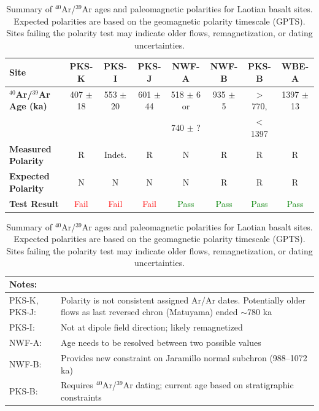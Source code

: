 \documentclass[twocolumn,11pt]{article}
\begin{document}
\begin{table}[htbp]
    \centering
    \caption{Summary of $^{40}$Ar/$^{39}$Ar ages and paleomagnetic polarities for Laotian basalt sites. Expected polarities are based on the geomagnetic polarity timescale (GPTS). Sites failing the polarity test may indicate older flows, remagnetization, or dating uncertainties.}
    \label{tab:age_polarity_summary}
    \small
    \begin{tabular}{|l|c|c|c|c|c|c|c|}
        \hline
        \textbf{Site} & \textbf{PKS-K} & \textbf{PKS-I} & \textbf{PKS-J} & \textbf{NWF-A} & \textbf{NWF-B} & \textbf{PKS-B} & \textbf{WBE-A} \\
        \hline
        \textbf{$^{40}$Ar/$^{39}$Ar Age (ka)} & 407 $\pm$ 18 & 553 $\pm$ 20 & 601 $\pm$ 44 & 518 $\pm$ 6 or & 935 $\pm$ 5 & $>$770, & 1397 $\pm$ 13 \\
        & & & & 740 $\pm$ ? & & $<$1397 & \\
        \hline
        \textbf{Measured Polarity} & R & Indet. & R & N & R & R & R \\
        \hline
        \textbf{Expected Polarity} & N & N & N & N & R & R & R \\
        \hline
        \textbf{Test Result} & \textcolor{red}{Fail} & \textcolor{red}{Fail} & \textcolor{red}{Fail} & \textcolor{green}{Pass} & \textcolor{green}{Pass} & \textcolor{green}{Pass} & \textcolor{green}{Pass} \\
        \hline
    \end{tabular}
    \vspace{0.5em}
    
    \footnotesize
    \begin{tabular}{|p{}|p{}|}
        \hline
        \textbf{Notes:} & \\
        \hline
        PKS-K, PKS-J: & Polarity is not consistent assigned Ar/Ar dates. Potentially older flows as last reversed chron (Matuyama) ended $\sim$780 ka \\
        \hline
        PKS-I: & Not at dipole field direction; likely remagnetized \\
        \hline
        NWF-A: & Age needs to be resolved between two possible values \\
        \hline
        NWF-B: & Provides new constraint on Jaramillo normal subchron (988--1072 ka) \\
        \hline
        PKS-B: & Requires $^{40}$Ar/$^{39}$Ar dating; current age based on stratigraphic constraints \\
        \hline
    \end{tabular}
\end{table}
\end{document}
